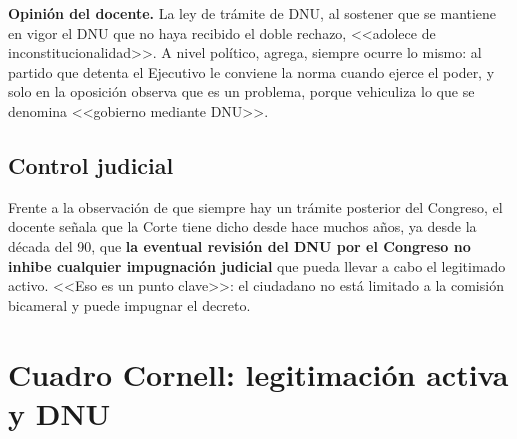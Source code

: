 \documentclass[12pt,oneside]{book}
\begin{document}
\begin{note}
\textbf{Opinión del docente.} La ley de trámite de DNU, al sostener que se mantiene en vigor el DNU que no haya recibido el doble rechazo, <<adolece de inconstitucionalidad>>. A nivel político, agrega, siempre ocurre lo mismo: al partido que detenta el Ejecutivo le conviene la norma cuando ejerce el poder, y solo en la oposición observa que es un problema, porque vehiculiza lo que se denomina <<gobierno mediante DNU>>.
\end{note}

\subsection{Control judicial}

Frente a la observación de que siempre hay un trámite posterior del Congreso, el docente señala que la Corte tiene dicho desde hace muchos años, ya desde la década del 90, que \textbf{la eventual revisión del DNU por el Congreso no inhibe cualquier impugnación judicial} que pueda llevar a cabo el legitimado activo. <<Eso es un punto clave>>: el ciudadano no está limitado a la comisión bicameral y puede impugnar el decreto.

\section{Cuadro Cornell: legitimación activa y DNU}
\end{document}
